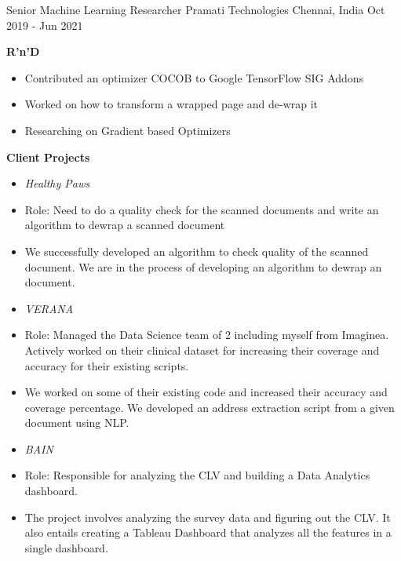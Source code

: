 \begin{cventries}
	\cventry
	{Senior Machine Learning Researcher}
	{Pramati Technologies}
	{Chennai, India}
	{Oct 2019 - Jun 2021}
	{
		\begin{justify}
			\textbf{R'n'D}
			\begin{itemize}
				\item Contributed an optimizer COCOB to Google TensorFlow SIG Addons 
				\item Worked on how to transform a wrapped page and de-wrap it 
				\item Researching on Gradient based Optimizers
			\end{itemize}
			\textbf{Client Projects}
			\begin{itemize}
				\item[] \textit{Healthy Paws}
				\item Role: Need to do a quality check for the scanned documents and write an algorithm to dewrap a scanned document
				\item We successfully developed an algorithm to check quality of the scanned document. We are in the process of developing an algorithm to dewrap an document.
				\item[] \textit{VERANA}
				\item Role: Managed the Data Science team of 2 including myself from Imaginea. Actively worked on their clinical dataset for increasing their coverage and accuracy for their existing scripts.
				\item We worked on some of their existing code and increased their accuracy and coverage percentage. We developed an address extraction script from a given document using NLP.
				\item[] \textit{BAIN}
				\item Role: Responsible for analyzing the CLV and building a Data Analytics dashboard.
				\item The project involves analyzing the survey data and figuring out the CLV. It also entails creating a Tableau Dashboard that analyzes all the features in a single dashboard.
			\end{itemize}
		\end{justify}
	}
	

\end{cventries}
